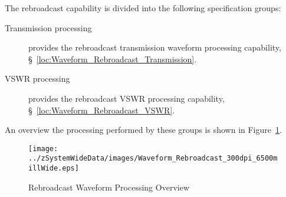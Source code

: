 The \ThisSys \ThisSegment rebroadcast capability is divided into the following specification groups:
\begin{description}
	\item[Transmission processing] provides the rebroadcast transmission waveform processing capability, \S~\ref{loc:Waveform_Rebroadcast_Transmission}.
	\item[VSWR processing]  provides the rebroadcast VSWR processing capability, \S~\ref{loc:Waveform_Rebroadcast_VSWR}.
\end{description}
An overview the processing performed by these groups is shown in Figure~\ref{fig:Rebroadcast_Waveform_Processing}.
\begin{figure}[htbp]
	\centering
		\texttt{[image: ../zSystemWideData/images/Waveform\_Rebroadcast\_300dpi\_6500millWide.eps]}
	\caption[Rebroadcast Waveform Processing Overview]{Rebroadcast Waveform Processing Overview}
	\label{fig:Rebroadcast_Waveform_Processing}
\end{figure}

%
%
%

